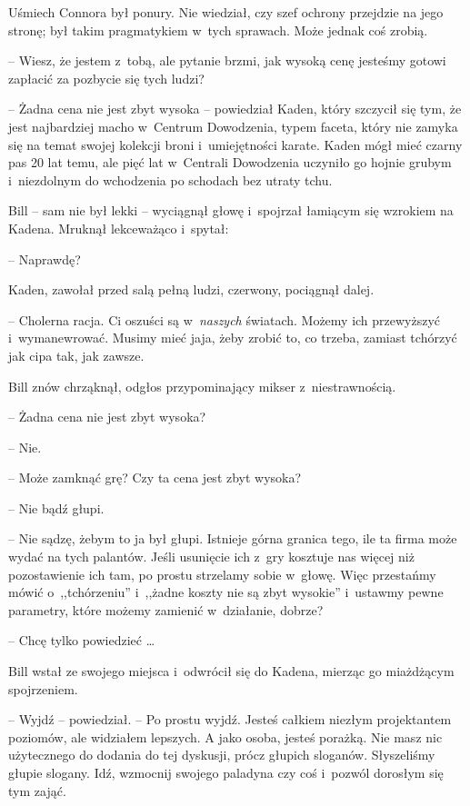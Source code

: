\documentclass[oneside,polish,11pt,rmheadings]{mwbk}
\begin{document}
Uśmiech Connora był ponury. Nie wiedział, czy szef ochrony przejdzie na jego stronę; był takim pragmatykiem w~tych sprawach. Może jednak coś zrobią. 

-- Wiesz, że jestem z~tobą, ale pytanie brzmi, jak wysoką cenę jesteśmy gotowi zapłacić za pozbycie się tych ludzi?

-- Żadna cena nie jest zbyt wysoka -- powiedział Kaden, który szczycił się tym, że jest najbardziej macho w~Centrum Dowodzenia, typem faceta, który nie zamyka się na temat swojej kolekcji broni i~umiejętności karate. Kaden mógł mieć czarny pas 20 lat temu, ale pięć lat w~Centrali Dowodzenia uczyniło go hojnie grubym i~niezdolnym do wchodzenia po schodach bez utraty tchu.

Bill -- sam nie był lekki -- wyciągnął głowę i~spojrzał łamiącym się wzrokiem na Kadena. Mruknął lekceważąco i~spytał: 

-- Naprawdę?

Kaden, zawołał przed salą pełną ludzi, czerwony, pociągnął dalej. 

-- Cholerna racja. Ci oszuści są w~\textit{naszych }światach. Możemy ich przewyższyć i~wymanewrować. Musimy mieć jaja, żeby zrobić to, co trzeba, zamiast tchórzyć jak cipa tak, jak zawsze.

Bill znów chrząknął, odgłos przypominający mikser z~niestrawnością. 

-- Żadna cena nie jest zbyt wysoka? 

-- Nie. 

-- Może zamknąć grę? Czy ta cena jest zbyt wysoka? 

-- Nie bądź głupi. 

-- Nie sądzę, żebym to ja był głupi. Istnieje górna granica tego, ile ta firma może wydać na tych palantów. Jeśli usunięcie ich z~gry kosztuje nas więcej niż pozostawienie ich tam, po prostu strzelamy sobie w~głowę. Więc przestańmy mówić o~,,tchórzeniu'' i~,,żadne koszty nie są zbyt wysokie'' i~ustawmy pewne parametry, które możemy zamienić w~działanie, dobrze?

-- Chcę tylko powiedzieć \ldots 

Bill wstał ze swojego miejsca i~odwrócił się do Kadena, mierząc go miażdżącym spojrzeniem. 

-- Wyjdź -- powiedział. -- Po prostu wyjdź. Jesteś całkiem niezłym projektantem poziomów, ale widziałem lepszych. A jako osoba, jesteś porażką. Nie masz nic użytecznego do dodania do tej dyskusji, prócz głupich sloganów. Słyszeliśmy głupie slogany. Idź, wzmocnij swojego paladyna czy coś i~pozwól dorosłym się tym zająć.
\end{document}
